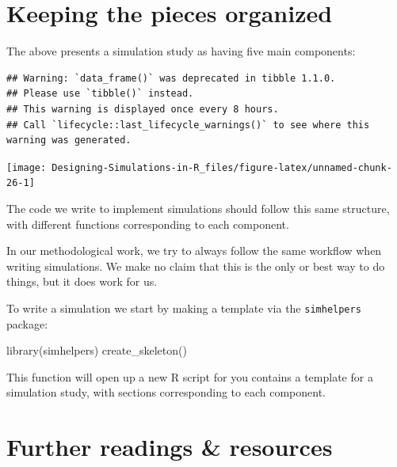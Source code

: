 \documentclass[
]{book}
\newenvironment{Shaded}{\begin{snugshade}}{\end{snugshade}}
\newcommand{\FunctionTok}[1]{\textcolor[rgb]{0.00,0.00,0.00}{#1}}
\newcommand{\NormalTok}[1]{#1}
\begin{document}
\hypertarget{keeping-the-pieces-organized}{%
\section{Keeping the pieces organized}\label{keeping-the-pieces-organized}}

The above presents a simulation study as having five main components:

\begin{verbatim}
## Warning: `data_frame()` was deprecated in tibble 1.1.0.
## Please use `tibble()` instead.
## This warning is displayed once every 8 hours.
## Call `lifecycle::last_lifecycle_warnings()` to see where this warning was generated.
\end{verbatim}

\begin{center}\texttt{[image: Designing-Simulations-in-R\_files/figure-latex/unnamed-chunk-26-1]} \end{center}

The code we write to implement simulations should follow this same structure, with different functions corresponding to each component.

In our methodological work, we try to always follow the same workflow when writing simulations.
We make no claim that this is the only or best way to do things, but it does work for us.

To write a simulation we start by making a template via the \texttt{simhelpers} package:

\begin{Shaded}
\begin{Highlighting}[]
\FunctionTok{library}\NormalTok{(simhelpers)}
\FunctionTok{create\_skeleton}\NormalTok{()}
\end{Highlighting}
\end{Shaded}

This function will open up a new R script for you contains a template for a simulation study, with sections corresponding to each component.

\hypertarget{further-readings-resources}{%
\section{Further readings \& resources}\label{further-readings-resources}}
\end{document}
